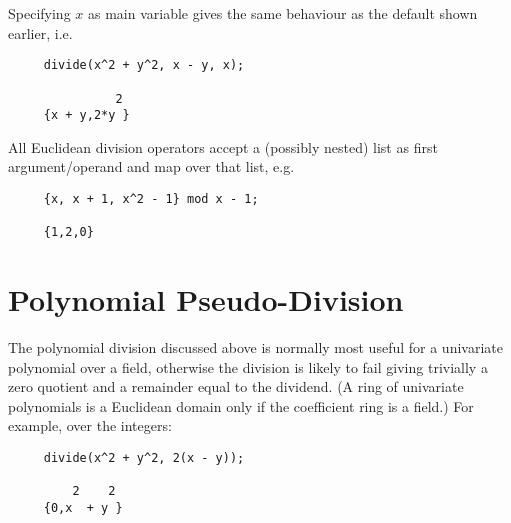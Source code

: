 Specifying $x$ as main variable gives the same behaviour as the
default shown earlier, i.e.
\begin{verbatim}
     divide(x^2 + y^2, x - y, x);

               2
     {x + y,2*y }
\end{verbatim}

All Euclidean division operators accept a (possibly nested) list as
first argument/operand and map over that list, e.g.
\begin{verbatim}
     {x, x + 1, x^2 - 1} mod x - 1;

     {1,2,0}
\end{verbatim}

\section{Polynomial Pseudo-Division}

The polynomial division discussed above is normally most useful for a
univariate polynomial over a field, otherwise the division is likely
to fail giving trivially a zero quotient and a remainder equal to the
dividend.  (A ring of univariate polynomials is a Euclidean domain
only if the coefficient ring is a field.)  For example, over the
integers:
\begin{verbatim}
     divide(x^2 + y^2, 2(x - y));

         2    2
     {0,x  + y }
\end{verbatim}

\hypertarget{operator:PSEUDO_DIVIDE}{}
\hypertarget{operator:PSEUDO_QUOTIENT}{}
\hypertarget{operator:PSEUDO_REMAINDER}{}

